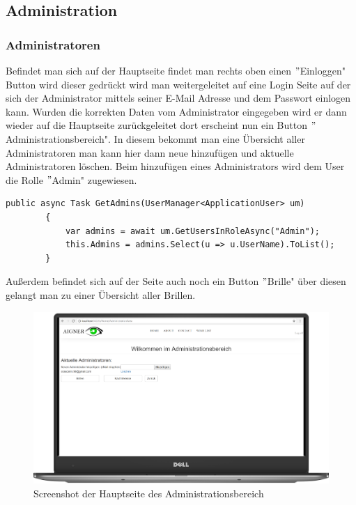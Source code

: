 \subsection{Administration}

\subsubsection{Administratoren}
Befindet man sich auf der Hauptseite findet man rechts oben einen $"$Einloggen" Button wird dieser gedrückt wird man weitergeleitet auf eine Login Seite auf der sich der Administrator mittels seiner E-Mail Adresse und dem Passwort einlogen kann. Wurden die korrekten Daten vom Administrator eingegeben wird er dann wieder auf die Hauptseite zurückgeleitet dort erscheint nun ein Button $"$Administrationsbereich". In diesem bekommt man eine Übersicht aller Administratoren man kann hier dann neue hinzufügen und aktuelle Administratoren löschen. Beim hinzufügen eines Administrators wird dem User die Rolle $"$Admin" zugewiesen.
\begin{lstlisting}
public async Task GetAdmins(UserManager<ApplicationUser> um)
        {
            var admins = await um.GetUsersInRoleAsync("Admin");
            this.Admins = admins.Select(u => u.UserName).ToList();
        }
\end{lstlisting} 
Außerdem befindet sich auf der Seite auch noch ein Button $"$Brille" über diesen gelangt man zu einer Übersicht aller Brillen.   

\begin{figure}[H]
\begin{center}
	\includegraphics[scale=.2]{images/Admin.png}
\end{center}
	\caption{Screenshot der Hauptseite des Administrationsbereich}
	\label{fig:sample}
\end{figure}


